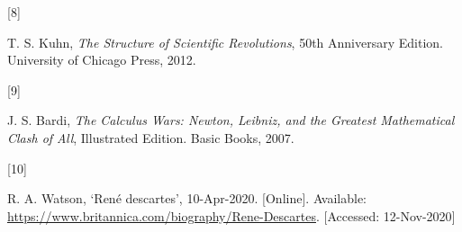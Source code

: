 \documentclass[
  a4paper,
]{article}
\newlength{\cslhangindent}
\newlength{\csllabelwidth}
\newlength{\cslentryspacingunit} %
\newenvironment{CSLReferences}[2] %
 {%
  \setlength{\parindent}{0pt}
  \ifodd #1
  \let\oldpar\par
  \def\par{\hangindent=\cslhangindent\oldpar}
  \fi
  \setlength{\parskip}{#2\cslentryspacingunit}
 }%
 {}
\newcommand{\CSLLeftMargin}[1]{\parbox[t]{\csllabelwidth}{#1}}
\newcommand{\CSLRightInline}[1]{\parbox[t]{\linewidth - \csllabelwidth}{#1}\break}
\begin{document}
\begin{CSLReferences}{0}{0}
\leavevmode{}%
\CSLLeftMargin{{[}8{]} }
\CSLRightInline{T. S. Kuhn, \emph{{The Structure of Scientific
Revolutions}}, 50th Anniversary Edition. University of Chicago Press,
2012. }

\leavevmode{}%
\CSLLeftMargin{{[}9{]} }
\CSLRightInline{J. S. Bardi, \emph{{The Calculus Wars: Newton, Leibniz,
and the Greatest Mathematical Clash of All}}, Illustrated Edition. Basic
Books, 2007. }

\leavevmode{}%
\CSLLeftMargin{{[}10{]} }
\CSLRightInline{R. A. Watson, {`René descartes'}, 10-Apr-2020.
{[}Online{]}. Available:
\url{https://www.britannica.com/biography/Rene-Descartes}. {[}Accessed:
12-Nov-2020{]}}

\end{CSLReferences}
\end{document}
